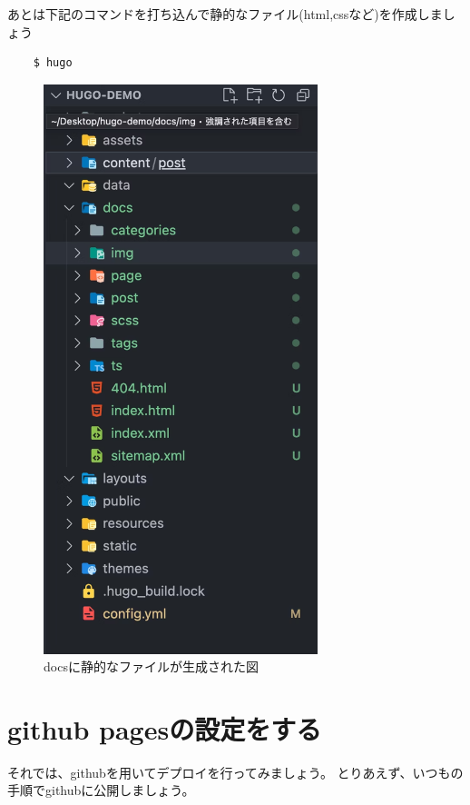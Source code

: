   あとは下記のコマンドを打ち込んで静的なファイル(html,cssなど)を作成しましょう


  \begin{shaded}
    \begin{verbatim}
    $ hugo
    \end{verbatim}
  \end{shaded}

  \begin{figure}[H]
    \centering
    \includegraphics[width=8cm]{./image/02-chap6/docs-genelate.png}
    \caption{docsに静的なファイルが生成された図}
    \label{chap6-docs-genelate-image}
  \end{figure}

\section{github pagesの設定をする}

  それでは、githubを用いてデプロイを行ってみましょう。
  とりあえず、いつもの手順でgithubに公開しましょう。

